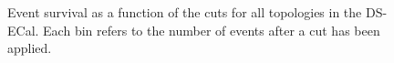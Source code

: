 \begin{figure}
\begin{minipage}{.5\linewidth}
\end{minipage}%
\begin{minipage}{.5\linewidth}
\centering
{}
\end{minipage}\par\medskip
\caption{Event survival as a function of the cuts for all topologies in the DS-ECal.  Each bin refers to the number of events after a cut has been applied.}
\label{fig:SelEventSurvivalDS}
\end{figure}
\newline
\newline
